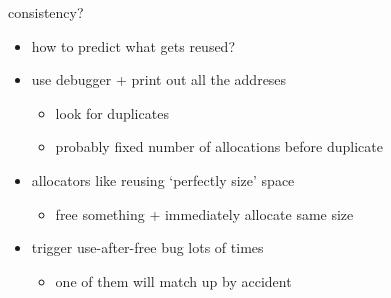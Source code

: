 \begin{frame}{consistency?}
    \begin{itemize}
    \item how to predict what gets reused?
    \vspace{.5cm}
    \item use debugger + print out all the addreses
        \begin{itemize}
        \item look for duplicates
        \item probably fixed number of allocations before duplicate
        \end{itemize}
    \item allocators like reusing `perfectly size' space
        \begin{itemize}
        \item free something + immediately allocate same size
        \end{itemize}
    \item trigger use-after-free bug lots of times
        \begin{itemize}
        \item one of them will match up by accident
        \end{itemize}
    \end{itemize}
\end{frame}
